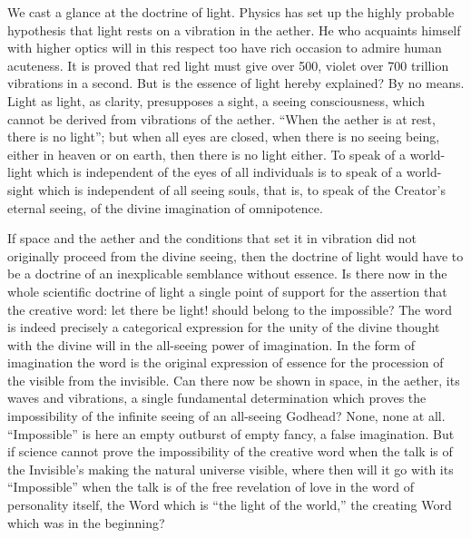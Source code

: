 \documentclass[12pt,a4paper,openany]{book}
\newcommand{\opage}[1]{\marginnote{\footnotesize\textit{[#1]}}}
\begin{document}
We cast a glance at the doctrine of light. Physics
has set up the highly probable hypothesis that light
rests on a vibration in the aether. He who acquaints himself
with higher optics will in this respect too
have rich occasion to admire human
acuteness. It is proved that red light
must give over 500, violet over 700 trillion
vibrations in a second. But is the essence of light
hereby explained? By no means. Light as light, as
clarity, presupposes a sight, a seeing consciousness, which
cannot be derived from vibrations of the aether. ``When the aether
is at rest, there is no light''; but when all eyes are closed,
when there is no seeing being, either in heaven
or on earth, then there is no light either. To speak
of a world-light which is independent of the eyes of all individuals
is to speak of a world-sight which is independent
of all seeing souls, that is, to speak of the Creator's eternal
seeing, of the divine imagination of omnipotence.

If space and the aether and the conditions
that set it in vibration did not originally proceed from
the divine seeing, then the doctrine of light would have to
be a doctrine of an inexplicable semblance without essence.
Is there now in the whole scientific doctrine of light a single
point of support for the assertion that the creative word: let there be light!
should belong to the impossible? The word is indeed precisely a
categorical expression for the unity of the divine thought
with the divine will in the all-seeing power of
imagination. In the form of imagination the word is the
original expression of essence for the procession of the visible
\setcounter{footnote}{0}%
\opage{68}from the invisible. Can there now be shown in space, in the aether,
its waves and vibrations, a single fundamental determination
which proves the impossibility of the infinite seeing of an all-seeing
Godhead? None, none at all. ``Impossible''
is here an empty outburst of empty fancy, a false imagination.
But if science cannot prove the impossibility of the creative word
when the talk is of the Invisible's
making the natural universe visible, where then will it
go with its ``Impossible'' when the talk is of the free
revelation of love in the word of personality itself, the
Word which is ``the light of the world,'' the creating Word which
was in the beginning?
\end{document}
